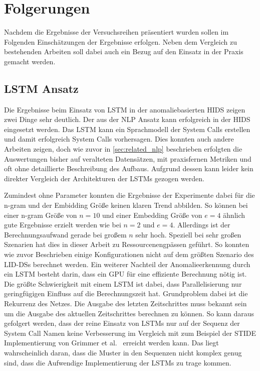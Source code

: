 \chapter{Folgerungen}\label{ch:folgerungen}
Nachdem die Ergebnisse der Versuchsreihen präsentiert wurden sollen im Folgenden Einschätzungen der Ergebnisse erfolgen.
Neben dem Vergleich zu bestehenden Arbeiten soll dabei auch ein Bezug auf den Einsatz in der Praxis gemacht werden.
\section{LSTM Ansatz}

Die Ergebnisse beim Einsatz von \ac{LSTM} in der anomaliebasierten \ac{HIDS} zeigen zwei Dinge sehr deutlich.
Der aus der \ac{NLP} Ansatz kann erfolgreich in der \ac{HIDS} eingesetzt werden.
Das \ac{LSTM} kann ein Sprachmodell der System Calls erstellen und damit erfolgreich System Calls vorhersagen.
Dies konnten auch andere Arbeiten zeigen, doch wie zuvor in \autoref{sec:related_nlp} beschrieben erfolgten die Auswertungen bisher auf veralteten Datensätzen, mit praxisfernen Metriken und oft ohne detaillierte Beschreibung des Aufbaus.
Aufgrund dessen kann leider kein direkter Vergleich der Architekturen der \acp{LSTM} gezogen werden.

Zumindest ohne Parameter konnten die Ergebnisse der Experimente dabei für die n-gram und der Embidding Größe keinen klaren Trend abbilden.
So können bei einer n-gram Größe von $n=10$ und einer Embedding Größe von $e=4$ ähnlich gute Ergebnisse erzielt werden wie bei $n=2$ und $e=4$.
Allerdings ist der Berechnungsaufwand gerade bei großem $n$ sehr hoch.
Speziell bei sehr großen Szenarien hat dies in dieser Arbeit zu Ressourcenengpässen geführt.
So konnten wie zuvor Beschrieben einige Konfigurationen nicht auf dem größten Szenario des \acp{LID-DS} berechnet werden.
Ein weiterer Nachteil der Anomalieerkennung durch ein \ac{LSTM} besteht darin, dass ein GPU für eine effiziente Berechnung nötig ist.
Die größte Schwierigkeit mit einem \ac{LSTM} ist dabei, dass Parallelisierung nur geringfügigen Einfluss auf die Berechnungszeit hat.
Grundproblem dabei ist die Rekurrenz des Netzes. 
Die Ausgabe des letzten Zeitschrittes muss bekannt sein um die Ausgabe des aktuellen Zeitschrittes berechnen zu können.
So kann daraus gefolgert werden, dass der reine Einsatz von \acp{LSTM} nur auf der Sequenz der System Call Namen keine Verbesserung im Vergleich mit zum Beispiel der \ac{STIDE} Implementierung von Grimmer et al.~\cite{IDSTHREADGRIMMER2021} erreicht werden kann.
Das liegt wahrscheinlich daran, dass die Muster in den Sequenzen nicht komplex genug sind, dass die Aufwendige Implementierung der \acp{LSTM} zu trage kommen.


